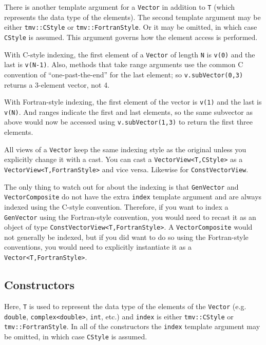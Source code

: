 \documentclass[twoside,letterpaper,11pt]{article}
\renewcommand{\tt}[1]{{\lstinline {#1}}}
\begin{document}
There is another template argument for a \tt{Vector} in addition to \tt{T} (which
represents the data type of the elements).  The second template argument
may be either \tt{tmv::CStyle} or \tt{tmv::FortranStyle}.  Or it may be omitted,
in which case \tt{CStyle} is assumed.  This argument governs how the element
access is performed.

With C-style indexing, the first element of a \tt{Vector} of length \tt{N} is 
\tt{v(0)} and the last is \tt{v(N-1)}.  Also, methods that take range arguments
use the common C convention of ``one-past-the-end'' for the last element;
so \tt{v.subVector(0,3)} returns a 3-element vector, not 4.

With Fortran-style indexing, the first element of the vector is \tt{v(1)} and the 
last is \tt{v(N)}.  And ranges indicate the first and last elements, so the same
subvector as above would now be accessed using \tt{v.subVector(1,3)} to return
the first three elements.

All views of a \tt{Vector} keep the same indexing style as the original unless you
explicitly change it with a cast.  You can cast a \tt{VectorView<T,CStyle>} as
a \tt{VectorView<T,FortranStyle>} and vice versa.  Likewise for
\tt{ConstVectorView}.  

The only thing to watch out for about the indexing is that \tt{GenVector}
and \tt{VectorComposite} do not have the extra \tt{index} 
template argument and are always
indexed using the C-style convention.  Therefore, 
if you want to index a \tt{GenVector}
using the Fortran-style convention, you would need to recast it
as an object of type
\tt{ConstVectorView<T,FortranStyle>}.  A \tt{VectorComposite} would 
not generally be indexed, but if you did want to do so using the 
Fortran-style conventions, you would need to explicitly instantiate it
as a \tt{Vector<T,FortranStyle>}.

\subsection{Constructors}

Here, \tt{T} is used to represent the data type of the elements of the \tt{Vector}
(e.g. \tt{double}, \tt{complex<double>}, \tt{int}, etc.) and \tt{index} is either
\tt{tmv::CStyle} or \tt{tmv::FortranStyle}.  In all of the constructors the
\tt{index} template argument may be omitted, in which case \tt{CStyle} is assumed.
\end{document}
